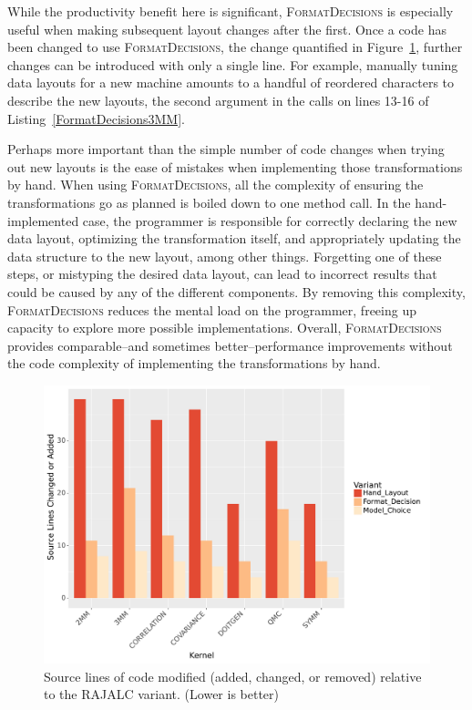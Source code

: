 \documentclass[sigconf,review=true]{acmart}
\newcommand{\FormatDecisions}[0]{{\textsc{FormatDecisions}}}
\begin{document}
While the productivity benefit here is significant, \FormatDecisions{} is especially useful when making subsequent layout changes after the first. 
Once a code has been changed to use \FormatDecisions{}, the change quantified in Figure~\ref{PolybenchSLOC}, further changes can be introduced with only a single line. 
For example, manually tuning data layouts for a new machine amounts to a handful of reordered characters to describe the new layouts, the second argument in the calls on lines 13-16 of Listing~\ref{FormatDecisions3MM}. 

Perhaps more important than the simple number of code changes when trying out new layouts is the ease of mistakes when implementing those transformations by hand. 
When using \FormatDecisions{}, all the complexity of ensuring the transformations go as planned is boiled down to one method call.
In the hand-implemented case, the programmer is responsible for correctly declaring the new data layout, optimizing the transformation itself, and appropriately updating the data structure to the new layout, among other things. 
Forgetting one of these steps, or mistyping the desired data layout, can lead to incorrect results that could be caused by any of the different components.
By removing this complexity, \FormatDecisions{} reduces the mental load on the programmer, freeing up capacity to explore more possible implementations.
Overall, \FormatDecisions{} provides comparable--and sometimes better--performance improvements without the code complexity of implementing the transformations by hand.



\begin{figure}
	\includegraphics[width=\columnwidth]{sloc.pdf}
	\caption{Source lines of code modified (added, changed, or removed) relative to the  RAJALC variant. (Lower is better)}
	\label{PolybenchSLOC}  
\end{figure}
\end{document}
